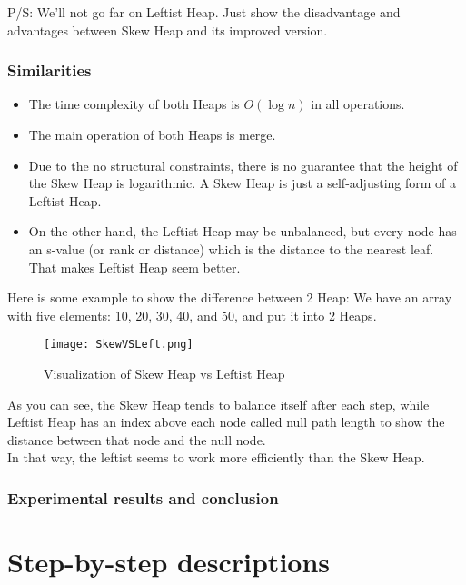 \documentclass[12pt, a4paper]{article}
\begin{document}
P/S: We'll not go far on Leftist Heap. Just show the disadvantage and advantages between Skew Heap and its improved version.

\subsubsection{Similarities}
\begin{itemize}
    \item The time complexity of both Heaps is $O(\log n)$ in all operations.
    \item The main operation of both Heaps is merge.
\end{itemize}
\begin{itemize}
    \item Due to the no structural constraints, there is no guarantee that the height of the Skew Heap is logarithmic. A Skew Heap is just a self-adjusting form of a Leftist Heap.
    \item On the other hand, the Leftist Heap may be unbalanced, but every node has an s-value (or rank or distance) which is the distance to the nearest leaf. That makes Leftist Heap seem better.
\end{itemize}

Here is some example to show the difference between 2 Heap:
We have an array with five elements: 10, 20, 30, 40, and 50, and put it into 2 Heaps.
\begin{figure}[H]
    \begin{center}
        \texttt{[image: SkewVSLeft.png]}
        \caption{Visualization of Skew Heap vs Leftist Heap}
    \end{center}
\end{figure}

As you can see, the Skew Heap tends to balance itself after each step, while Leftist Heap has an index above each node called null path length to show the distance between that node and the null node.\\

In that way, the leftist seems to work more efficiently than the Skew Heap.\\
\subsubsection{Experimental results and conclusion}
\pagebreak


\section{Step-by-step descriptions}
\end{document}
